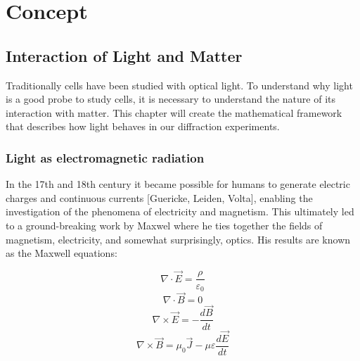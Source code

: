 \part{Concept}%

\chapter{Interaction of Light and Matter}
Traditionally cells have been studied with optical light. To understand why light is a good probe to study cells, it is necessary to understand the nature of its interaction with matter. This chapter will create the mathematical framework that describes how light behaves in our diffraction experiments. 

\section{Light as electromagnetic radiation}
In the 17th and 18th century it became possible for humans to generate electric charges and continuous currents [Guericke, Leiden, Volta], enabling the investigation of the phenomena of electricity and magnetism. This ultimately led to a ground-breaking work by Maxwel where he ties together the fields of magnetism, electricity, and somewhat surprisingly, optics. His results are known as the Maxwell equations:

\begin{equation} \nabla \cdot   \vec{E} = \frac{\rho}{\varepsilon_0 }\label{eq:maxlaw1}\end{equation}
\begin{equation} \nabla \cdot   \vec{B} = 0 \label{eq:maxlaw2}\end{equation}
\begin{equation} \nabla \times \vec{E} = -\frac{d\vec{B}}{dt}\label{eq:maxlaw3}\end{equation}
\begin{equation} \nabla \times \vec{B} = \mu_0 \vec{J} -\mu\varepsilon\frac{d\vec{E}}{dt}\label{eq:maxlaw4}\end{equation}

